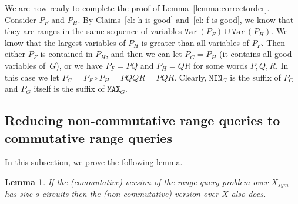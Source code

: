 \documentclass[11pt]{article}
\numberwithin{equation}{section}
\newtheorem{lemma}[theorem]{Lemma}
\theoremstyle{definition}
\theoremstyle{plain}
\newcommand{\expref}[2]{\hyperref[#2]{#1~\ref{#2}}}
\theoremstyle{plain}\newtheorem{observation}[theorem]{Observation}
\newcommand{\mmin}{\texttt{MIN}}
\newcommand{\mmax}{\texttt{MAX}}
\newcommand{\var}{\texttt{Var}\,}  %
\begin{document}
We are now ready to complete the proof of \expref{Lemma}{lemma:correctorder}.
Consider $P_F$ and $P_H$. By \expref{Claims}{cl: h is good} \expref{and}{cl: f is good}, we know that they are ranges in the same sequence of variables $\var(P_F)\cup \var(P_H)$. We know that the largest variables of $P_H$ is greater than all variables of $P_F$. Then either $P_F$ is contained in $P_H$, and then we can let $P_G=P_H$ (it contains all good variables of~$G$), or we have $P_F =PQ$ and $P_H=QR$ for some words $P, Q, R$. In this case we let $P_G = P_F \circ P_H = PQQR=PQR$. Clearly, $\mmin_G$ is the suffix of $P_G$ and $P_G$ itself is the suffix of $\mmax_G$.
%



\subsection{Reducing non-commutative range queries to commutative range queries} \label{sec:non-commutative_to_commutative}
%

In this subsection, we prove the following lemma.

\begin{lemma} \label{lem:intervals}
    If the (commutative) version of the
    range query
    problem over $X_{sym}$ has
    size $s$ circuits then the (non-commutative) version over $X$ also does.
\end{lemma}
\end{document}
